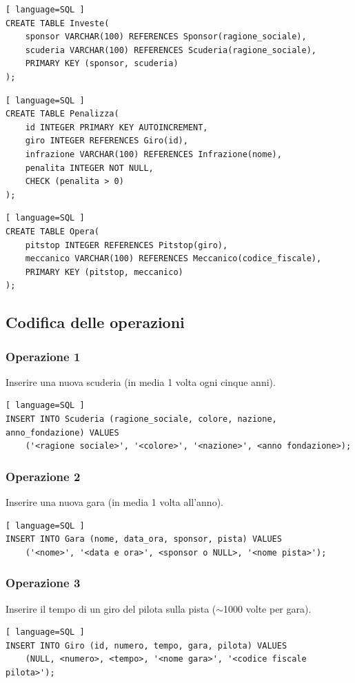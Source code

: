 \documentclass[11pt]{article}
\begin{document}
\begin{lstlisting}[ language=SQL ]
CREATE TABLE Investe(
    sponsor VARCHAR(100) REFERENCES Sponsor(ragione_sociale),
    scuderia VARCHAR(100) REFERENCES Scuderia(ragione_sociale),
    PRIMARY KEY (sponsor, scuderia)
);
\end{lstlisting}

\begin{lstlisting}[ language=SQL ]
CREATE TABLE Penalizza(
    id INTEGER PRIMARY KEY AUTOINCREMENT,
    giro INTEGER REFERENCES Giro(id),
    infrazione VARCHAR(100) REFERENCES Infrazione(nome),
    penalita INTEGER NOT NULL,
    CHECK (penalita > 0)
);
\end{lstlisting}

\begin{lstlisting}[ language=SQL ]
CREATE TABLE Opera(
    pitstop INTEGER REFERENCES Pitstop(giro),
    meccanico VARCHAR(100) REFERENCES Meccanico(codice_fiscale),
    PRIMARY KEY (pitstop, meccanico)
);
\end{lstlisting}


\subsection{Codifica delle operazioni}

\subsubsection{Operazione 1}
Inserire una nuova scuderia (in media 1 volta ogni cinque anni).
\begin{lstlisting}[ language=SQL ]
INSERT INTO Scuderia (ragione_sociale, colore, nazione, anno_fondazione) VALUES
    ('<ragione sociale>', '<colore>', '<nazione>', <anno fondazione>);
\end{lstlisting}


\subsubsection{Operazione 2}
Inserire una nuova gara (in media 1 volta all'anno).
\begin{lstlisting}[ language=SQL ]
INSERT INTO Gara (nome, data_ora, sponsor, pista) VALUES 
    ('<nome>', '<data e ora>', <sponsor o NULL>, '<nome pista>');
\end{lstlisting}


\subsubsection{Operazione 3}
Inserire il tempo di un giro del pilota sulla pista ($\sim$1000 volte per gara).
\begin{lstlisting}[ language=SQL ]
INSERT INTO Giro (id, numero, tempo, gara, pilota) VALUES 
    (NULL, <numero>, <tempo>, '<nome gara>', '<codice fiscale pilota>');
\end{lstlisting}
\end{document}
